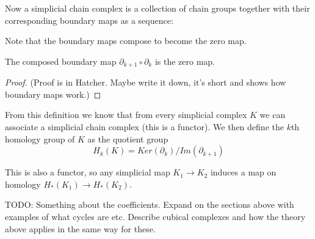 Now a simplicial chain complex is a collection of chain groups together with their corresponding boundary maps as a sequence:
\begin{center}
\end{center}
Note that the boundary maps compose to become the zero map.
\begin{theorem}
The composed boundary map $\partial_{k+1} \circ \partial_{k}$ is the zero map.
\end{theorem}
\begin{proof}
(Proof is in Hatcher. Maybe write it down, it's short and shows how boundary maps work.)
\end{proof}
From this definition we know that from every simplicial complex $K$ we can associate a simplicial chain complex (this is a functor). We then define the $k$th homology group of $K$ as the quotient group
\[H_{k}(K) = Ker(\partial_{k})/Im(\partial_{k+1})\]

This is also a functor, so any simplicial map $K_{1} \to K_{2}$ induces a map on homology $H_{*}(K_{1}) \to H_{*}(K_{2})$.

TODO: Something about the coefficients. Expand on the sections above with examples of what cycles are etc. Describe cubical complexes and how the theory above applies in the same way for these.

